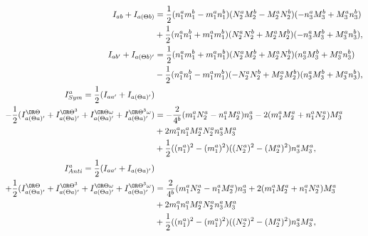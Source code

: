 \begin{equation}
\begin{aligned}
I_{ab} + I_{ a(\Theta b)}  &=
\frac{1}{2} (n^a_1 m^b_1-m^a_1 n^b_1) (N^a_2 M^b_2-M^a_2 N^b_2) (-n^a_3 M^b_3+M^a_3 n^b_3) \\
& +\frac{1}{2}(n^a_1 n^b_1+m^a_1 m^b_1) (N^a_2 N^b_2+M^a_2 M^b_2) (-n^a_3 M^b_3+M^a_3 n^b_3),\\
I_{ab'} + I_{a(\Theta b)'} &=
\frac{1}{2} (n^a_1 m^b_1+m^a_1 n^b_1) (N^a_2 M^b_2+M^a_2 N^b_2) (n^a_3 M^b_3+M^a_3 n^b_3) \\
& -\frac{1}{2} (n^a_1 n^b_1-m^a_1 m^b_1) (-N^a_2 N^b_2+M^a_2 M^b_2) (n^a_3 M^b_3+M^a_3 n^b_3),\\
I^a_{Sym}=\frac{1}{2}(I_{aa'}+I_{a(\Theta a)'}) & \\ 
-\frac{1}{2}(I^{\OR\Theta}_{a(\Theta a)'}+I^{\OR\Theta^3}_{a(\Theta a)'} 
+I^{\OR\Theta\omega}_{a(\Theta a)'} +I^{\OR\Theta^3\omega}_{a(\Theta a)'}) &=
 -\frac{2}{4^b} (m^a_1 N^a_2-n^a_1 M^a_2) n^a_3
-2(m^a_1 M^a_2+n^a_1 N^a_2) M^a_3 \\
 & +2m^a_1 n^a_1 M^a_2 N^a_2 n^a_3 M^a_3 \\
& + \frac{1}{2}((n^a_1)^2-(m^a_1)^2)((N^a_2)^2-(M^a_2)^2) n^a_3 M^a_3,\\
I^a_{Anti}= \frac{1}{2}(I_{aa'}+I_{a(\Theta a)'}) & \\ 
+\frac{1}{2}(I^{\OR\Theta}_{a(\Theta a)'}+I^{\OR\Theta^3}_{a(\Theta a)'}
+I^{\OR\Theta\omega}_{a(\Theta a)'} +I^{\OR\Theta^3\omega}_{a(\Theta a)'}) &=
 \frac{2}{4^b} (m^a_1 N^a_2-n^a_1 M^a_2) n^a_3
+2(m^a_1 M^a_2+n^a_1 N^a_2) M^a_3 \\
 & +2m^a_1 n^a_1 M^a_2 N^a_2 n^a_3 M^a_3 \\
& + \frac{1}{2}((n^a_1)^2-(m^a_1)^2)((N^a_2)^2-(M^a_2)^2) n^a_3 M^a_3,
\end{aligned}\label{EqAppInters}
\end{equation}


